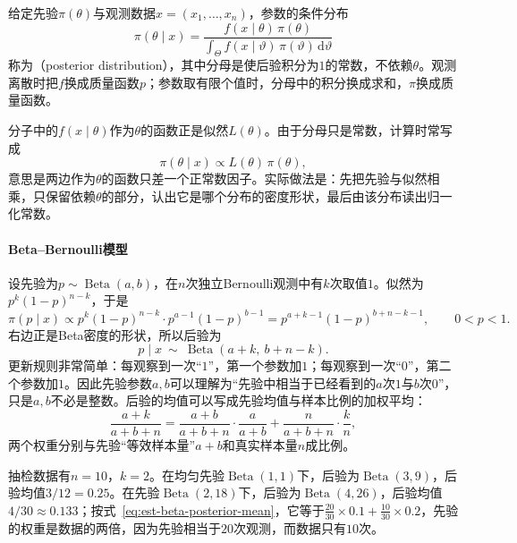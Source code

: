 \begin{definition}[后验分布]
\label{def:est-posterior}
给定先验$\pi(\theta)$与观测数据$x=(x_1,\dots,x_n)$，参数的条件分布
\begin{equation}
\label{eq:est-bayes}
\pi(\theta\mid x)=\frac{f(x\mid\theta)\,\pi(\theta)}{\int_\Theta f(x\mid\vartheta)\,\pi(\vartheta)\,\mathrm{d}\vartheta}
\end{equation}
称为（posterior distribution），其中分母是使后验积分为$1$的常数，不依赖$\theta$。观测离散时把$f$换成质量函数$p$；参数取有限个值时，分母中的积分换成求和，$\pi$换成质量函数。
\end{definition}

分子中的$f(x\mid\theta)$作为$\theta$的函数正是似然$L(\theta)$。由于分母只是常数，计算时常写成
\[
\pi(\theta\mid x)\propto L(\theta)\,\pi(\theta),
\]
意思是两边作为$\theta$的函数只差一个正常数因子。实际做法是：先把先验与似然相乘，只保留依赖$\theta$的部分，认出它是哪个分布的密度形状，最后由该分布读出归一化常数。

\paragraph{Beta--Bernoulli模型}
设先验为$p\sim\operatorname{Beta}(a,b)$，在$n$次独立Bernoulli观测中有$k$次取值$1$。似然为$p^k(1-p)^{n-k}$，于是
\[
\pi(p\mid x)\propto p^k(1-p)^{n-k}\cdot p^{a-1}(1-p)^{b-1}=p^{a+k-1}(1-p)^{b+n-k-1},\qquad 0<p<1 .
\]
右边正是Beta密度的形状，所以后验为
\begin{equation}
\label{eq:est-beta-posterior}
p\mid x\ \sim\ \operatorname{Beta}(a+k,\ b+n-k) .
\end{equation}
更新规则非常简单：每观察到一次“$1$”，第一个参数加$1$；每观察到一次“$0$”，第二个参数加$1$。因此先验参数$a,b$可以理解为“先验中相当于已经看到的$a$次$1$与$b$次$0$”，只是$a,b$不必是整数。后验的均值可以写成先验均值与样本比例的加权平均：
\begin{equation}
\label{eq:est-beta-posterior-mean}
\frac{a+k}{a+b+n}=\frac{a+b}{a+b+n}\cdot\frac{a}{a+b}+\frac{n}{a+b+n}\cdot\frac{k}{n},
\end{equation}
两个权重分别与先验“等效样本量”$a+b$和真实样本量$n$成比例。

\begin{example}[抽检数据的后验]
\label{ex:est-beta-posterior}
抽检数据有$n=10$，$k=2$。在均匀先验$\operatorname{Beta}(1,1)$下，后验为$\operatorname{Beta}(3,9)$，后验均值$3/12=0.25$。在先验$\operatorname{Beta}(2,18)$下，后验为$\operatorname{Beta}(4,26)$，后验均值$4/30\approx0.133$；按式~\eqref{eq:est-beta-posterior-mean}，它等于$\frac{20}{30}\times0.1+\frac{10}{30}\times0.2$，先验的权重是数据的两倍，因为先验相当于$20$次观测，而数据只有$10$次。
\end{example}

